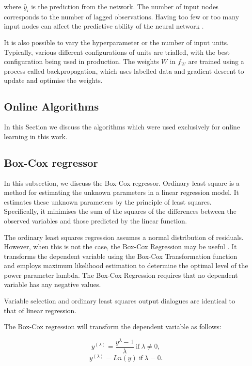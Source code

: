 \noindent where $\hat{y}_i$ is the prediction from the network. The number of input nodes corresponds to the number of lagged observations. Having too few or too many input nodes can affect the predictive ability of the neural network \cite{Pao2007}.

It is also possible to vary the hyperparameter or the number of input units. Typically, various different configurations of units are trialled, with the best configuration being used in production. The weights $W$ in $f_W$ are trained using a process called backpropagation\cite{rumelhart1986learning}, which uses labelled data and gradient descent to update and optimise the weights.

\subsection{Online Algorithms}

In this Section we discuss the algorithms which were used exclusively for online learning in this work.

\subsection{Box-Cox regressor}

In this subsection, we discuss the Box-Cox regressor. Ordinary least square is a method for estimating the unknown parameters in a linear regression model. It estimates these unknown parameters by the principle of least squares. Specifically, it minimises the sum of the squares of the differences between the observed variables and those predicted by the linear function.

The ordinary least squares regression assumes a normal distribution of residuals. However, when this is not the case, the Box-Cox Regression may be useful \cite{Box1964}. It transforms the dependent variable using the Box-Cox Transformation function and employs maximum likelihood estimation to determine the optimal level of the power parameter lambda. The Box-Cox Regression requires that no dependent variable has any negative values.

Variable selection and ordinary least squares output dialogues are identical to that of linear regression. 

The Box-Cox regression will transform the dependent variable as follows:

\begin{equation}
y^{(\lambda)} = \frac{y^{\lambda}-1}{\lambda}\:\text{if} \:\lambda\neq0,
\end{equation}
\begin{equation}
y^{(\lambda)} = Ln(y)\; \text{if}\: \lambda=0.
\end{equation}

